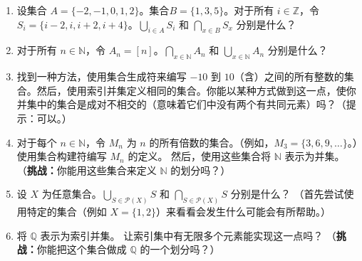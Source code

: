 \begin{enumerate}[label=(\arabic*)]
    \item 设集合 $A = \{-2, -1, 0, 1, 2\}$。集合$ B = \{1, 3, 5\}$。对于所有 $i \in \mathbb{Z}$，令 $S_i = \{i - 2, i, i + 2, i + 4\}$。$\displaystyle{\bigcup_{i \in A}S_i}$ 和 $\displaystyle{\bigcap_{x \in B}S_x}$ 分别是什么？
    \item 对于所有 $n \in \mathbb{N}$，令 $A_n = [n]$。$\displaystyle{\bigcap_{x \in \mathbb{N}}A_n}$ 和 $\displaystyle{\bigcup_{x \in \mathbb{N}}A_n}$ 分别是什么？
    \item 找到一种方法，使用集合生成符来编写 $-10$ 到 $10$（含）之间的所有整数的集合。然后，使用索引并集定义相同的集合。你能以某种方式做到这一点，使你并集中的集合是成对不相交的（意味着它们中没有两个有共同元素）吗？（提示：可以。）
    \item 对于每个 $n \in \mathbb{N}$，令 $M_n$ 为 $n$ 的所有倍数的集合。（例如，$M_3 = \{3, 6, 9,\dots\}$。）使用集合构建符编写 $M_n$ 的定义。 然后，使用这些集合将 $\mathbb{N}$ 表示为并集。
    （\textbf{挑战：}你能用这些集合来定义 $\mathbb{N}$ 的划分吗？）
    \item 设 $X$ 为任意集合。$\displaystyle{\bigcup_{S \in \mathcal{P}(X)}S}$ 和 $\displaystyle{\bigcap_{S \in \mathcal{P}(X)}S}$ 分别是什么？
    （首先尝试使用特定的集合（例如 $X = \{1, 2\}$）来看看会发生什么可能会有所帮助。）
    \item 将 $\mathbb{Q}$ 表示为索引并集。
    让索引集中有无限多个元素能实现这一点吗？
    （\textbf{挑战：}你能把这个集合做成 $\mathbb{Q}$ 的一个划分吗？）
\end{enumerate}